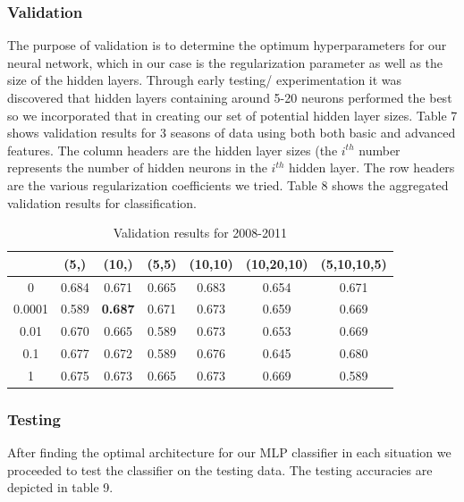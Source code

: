 \documentclass{article}
\begin{document}
\subsubsection{Validation}
The purpose of validation is to determine the optimum hyperparameters for our neural network, which in our case is the regularization parameter as well as the size of the hidden layers. Through early testing/ experimentation it was discovered that hidden layers containing around 5-20 neurons performed the best so we incorporated that in creating our set of potential hidden layer sizes. Table 7 shows validation results for 3 seasons of data using both both basic and advanced features. The column headers are the hidden layer sizes (the $i^{th}$ number represents the number of hidden neurons in the $i^{th}$ hidden layer. The row headers are the various regularization coefficients we tried. Table 8 shows the aggregated validation results for classification.

\begin{table}
  \begin{center}
    \begin{tabular}{ | c | c | c | c | c | c | c |}
      \hline
            &             	(5,) & 	(10,) & 	(5,5) &  	(10,10) & 	(10,20,10) & 	(5,10,10,5)  \\ \hline
	0  &     	0.684 & 	0.671&	0.665&	0.683&	0.654&		0.671	    \\ \hline
	0.0001 &   0.589 &     \textbf{0.687}&	0.671&	0.673&	0.659&		0.669	    \\ \hline	
	0.01  &    	0.670 &     0.665&	0.589&	0.673&	0.653&		0.669	    \\ \hline	
	0.1	&	0.677&	0.672&	0.589&	0.676&	0.645&		0.680	    \\ \hline
	1&		0.675&	0.673&	0.665&	0.673&	0.669&		0.589	    \\ \hline
	
    \end{tabular}
  \end{center}
  \caption{Validation results for 2008-2011}
\end{table}



\subsubsection{Testing}

After finding the optimal architecture for our MLP classifier in each situation we proceeded to test the classifier on the testing data. The testing accuracies are depicted in table 9.
\end{document}
